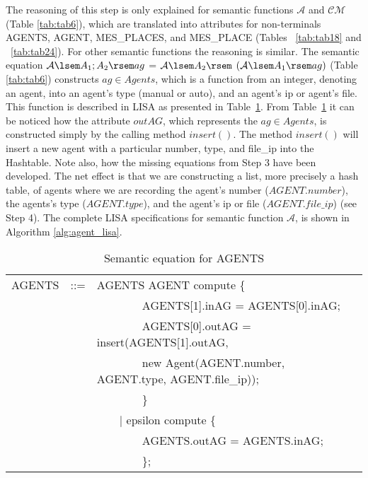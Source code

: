 \documentclass[preprint, prX]{revtex4}
\begin{document}
The reasoning of this step is only explained for semantic functions $\mathcal{A}$ and $\mathcal{CM}$ (Table \ref{tab:tab6}), which are translated into attributes for non-terminals AGENTS, AGENT, MES\_PLACES, and MES\_PLACE (Tables ~\ref{tab:tab18} and ~\ref{tab:tab24}). For other semantic functions the reasoning is similar.
The semantic equation $\mathcal{A} \lsem A_{1};A_{2}\rsem ag$ = $\mathcal{A} \lsem A_{2} \rsem$ $(\mathcal{A} \lsem A_{1} \rsem ag)$ (Table \ref{tab:tab6}) constructs $ag \in Agents$, which is a function from an integer, denoting an agent, into an agent's type (manual or auto), and an agent's ip or agent's file. This function is described in LISA  as presented in Table~\ref{tab:tab25a}. From Table~\ref{tab:tab25a} it can be noticed how the attribute $outAG$, which represents the $ag \in Agents$, is constructed simply by the calling method $insert()$. The method $insert()$ will insert a new agent with a particular number, type, and file\_ip into the Hashtable. Note also, how the missing equations from Step 3 have been developed.
The net effect is that we are constructing a list, more precisely a hash table, of agents where we are recording the agent's number ($AGENT.number$), the agents's type ($AGENT.type$), and the agent's ip or file ($AGENT.file\_ip$) (see Step 4). The complete LISA specifications for semantic function $\mathcal{A}$, is shown in Algorithm \ref{alg:agent_lisa}.

\begin{table}[htb]           \caption{Semantic equation for AGENTS}
\label{tab:tab25a}
\vspace{-5mm}
\footnotesize
\begin{center}
\begin{tabular}{ | l  l  l | }
\hline
AGENTS & ::= & AGENTS  AGENT compute \{ \\
 & & \ \ \ \ \ \ \ \ AGENTS[1].inAG = AGENTS[0].inAG; \\
 & & \ \ \ \ \ \ \ \ AGENTS[0].outAG = insert(AGENTS[1].outAG, \\
 & & \ \ \ \ \ \ \ \ new Agent(AGENT.number, AGENT.type, AGENT.file\_ip)); \\
 & & \ \ \ \ \ \ \ \ \} \\
 & & \ \ \ \ $\mid$ epsilon compute \{ \\
 & & \ \ \ \ \ \ \ \ AGENTS.outAG = AGENTS.inAG; \\
 & & \ \ \ \ \ \ \ \ \}; \\
\hline
\end{tabular}
\end{center}
\normalsize
\vspace{-5mm}
\end{table}
\end{document}
